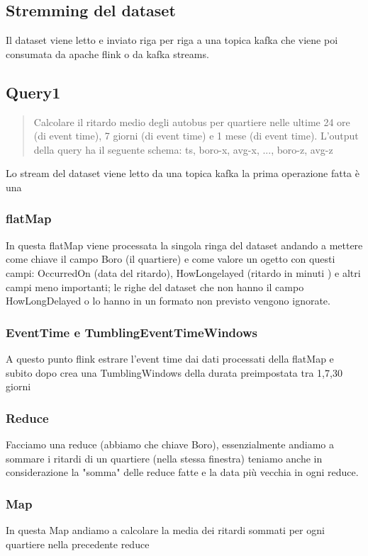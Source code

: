\documentclass[acmsmall]{acmart}
\begin{document}
\subsection{Stremming del dataset}
Il dataset viene letto e inviato riga per riga a una topica kafka che viene poi consumata da apache flink o da kafka streams.

\subsection{Query1}
\begin{quote}
Calcolare il ritardo medio degli autobus per quartiere nelle ultime 24 ore (di event time), 7 giorni (di
event time) e 1 mese (di event time). L’output della query ha il seguente schema: ts, boro-x, avg-x, ..., boro-z, avg-z
\end{quote}

Lo stream del dataset viene letto da una topica kafka la prima operazione fatta 
è una 
\subsubsection{flatMap} 
In questa flatMap viene processata la singola ringa del dataset andando a mettere come chiave il campo Boro (il quartiere) e come valore un ogetto con questi campi: OccurredOn (data del ritardo), HowLongelayed (ritardo in minuti ) e altri campi meno importanti;
le righe del dataset che non hanno il campo HowLongDelayed o lo hanno in un formato non previsto vengono ignorate.
\subsubsection{EventTime e TumblingEventTimeWindows}
A questo punto flink estrare l'event time dai dati processati della flatMap e 
subito dopo crea una TumblingWindows della durata preimpostata tra 1,7,30 giorni

\subsubsection{Reduce}
Facciamo una reduce (abbiamo che chiave Boro), essenzialmente andiamo a sommare i ritardi di un quartiere (nella stessa finestra) 
teniamo anche in considerazione la "somma" delle reduce fatte e la data più vecchia in ogni reduce.

\subsubsection{Map}
In questa Map andiamo a calcolare la media dei ritardi sommati per ogni quartiere nella precedente reduce
\end{document}

